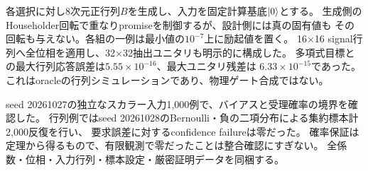 各選択に対し8次元正行列$B$を生成し、入力を固定計算基底$\lvert 0\rangle$とする。
生成側のHouseholder回転で重なりpromiseを制御するが、設計側には真の固有値も
その回転も与えない。各組の一例は最小値の$10^{-7}$上に励起値を置く。
16×16 signal行列へ全位相を適用し、32×32抽出ユニタリも明示的に構成した。
多項式目標との最大行列応答誤差は$5.55\times10^{-16}$、最大ユニタリ残差は
$6.33\times10^{-15}$であった。これはoracleの行列シミュレーションであり、物理ゲート合成ではない。

seed 20261027の独立なスカラー入力1,000例で、バイアスと受理確率の境界を確認した。
行列例ではseed 20261028のBernoulli・負の二項分布による集約標本計2,000反復を行い、
要求誤差に対するconfidence failureは零だった。
確率保証は定理から得るもので、有限観測で零だったことは整合確認にすぎない。
全係数・位相・入力行列・標本設定・厳密証明データを同梱する。
